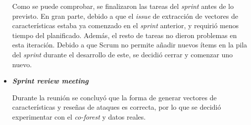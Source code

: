\begin{itemize}
	Como se puede comprobar, se finalizaron las tareas del \textit{sprint} antes de lo previsto. En gran parte, debido a que el \textit{issue} de extracción de vectores de características estaba ya comenzado en el \textit{sprint} anterior, y requirió menos tiempo del planificado. Además, el resto de tareas no dieron problemas en esta iteración. Debido a que Scrum no permite añadir nuevos ítems en la pila del \textit{sprint} durante el desarrollo de este, se decidió cerrar y comenzar uno nuevo.

	\item \textbf{\textit{Sprint review meeting}}
	
	Durante la reunión se concluyó que la forma de generar vectores de características y reseñas de ataques es correcta, por lo que se decidió experimentar con el \textit{co-forest} y datos reales.
	
\end{itemize}



